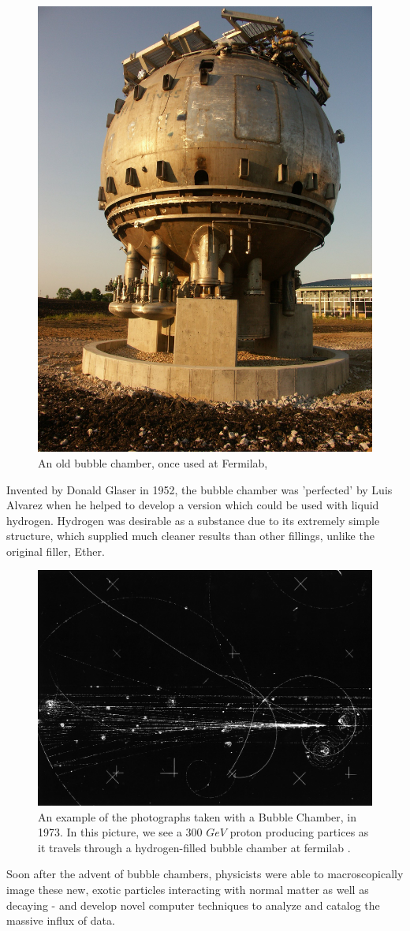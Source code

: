 \begin{figure}[ht]
	\centering
	\includegraphics[width=0.5\linewidth]{./figures/bubblechamberfnal.jpg}
	\caption{An old bubble chamber, once used at Fermilab,
	 \cite{FNALBubbleChamber2005}}
	\label{fig:bubble_chamber}
\end{figure}

Invented by Donald Glaser in 1952, the bubble chamber was 'perfected' by Luis
Alvarez when he helped to develop a version which could be used with liquid
hydrogen. Hydrogen was desirable as a substance due to its extremely simple
structure, which supplied much cleaner results than other fillings, unlike the
original filler, Ether.

\begin{figure}[ht]
	\centering
	\includegraphics[width=0.5\linewidth]{./figures/bubble_chamber_tracks.jpg}
	\caption{
		An example of the photographs taken with a Bubble Chamber, in 1973.
		In this picture, we see a 300 $GeV$ proton producing partices as it travels
		through a hydrogen-filled bubble chamber at fermilab  \cite{HD6B235}.
	}
	\label{fig:bubble_tracks}
\end{figure}

Soon after the advent of bubble chambers, physicists were able to
macroscopically image these new, exotic particles interacting with normal matter
as well as decaying - and develop novel computer techniques to analyze and
catalog the massive influx of data.

